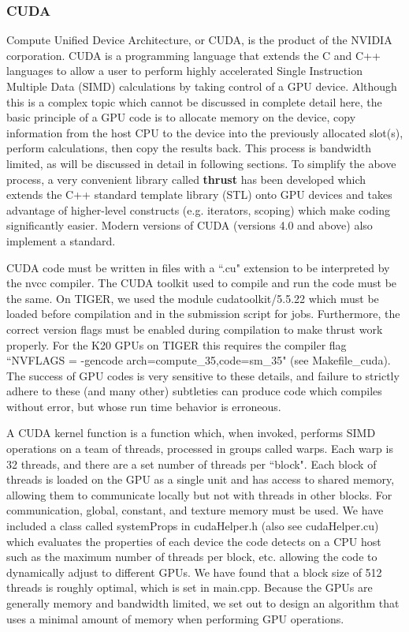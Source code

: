 \documentclass[12pt]{article}
\begin{document}
\subsubsection{CUDA}
Compute Unified Device Architecture, or CUDA, is the product of the NVIDIA corporation.  
%
CUDA is a programming language  that extends the C and C++ languages to allow a user to perform highly accelerated Single Instruction Multiple Data (SIMD) calculations by taking control of a GPU device.  Although this is a complex topic which cannot be discussed in complete detail here, the basic principle of a
GPU code is to allocate memory on the device, copy information from the host CPU to the device into the previously allocated slot(s), perform calculations, then copy the results back. This process is bandwidth limited, as will be discussed in detail in following sections.  To simplify the above process, a very convenient library called \textbf{thrust} has been developed which extends the C++ standard template library (STL) onto GPU devices and takes advantage of higher-level constructs (e.g. iterators, scoping) which make coding significantly easier.  Modern versions of CUDA (versions 4.0 and above) also implement a standard.

CUDA code must be written in files with a ``.cu" extension to be interpreted by the nvcc compiler.  The CUDA toolkit used to compile and run the code must be the same.  On TIGER, we used the module cudatoolkit/5.5.22 which must be loaded before compilation and in the submission script for jobs.  Furthermore, the correct version flags must be enabled during compilation to make thrust work properly.  For the K20 GPUs on TIGER this requires the compiler flag ``NVFLAGS = -gencode arch=compute\_35,code=sm\_35" (see Makefile\_cuda).  The success of GPU codes is very sensitive to these details, and failure to strictly adhere to these (and many other) subtleties can produce code which compiles without error, but whose run time behavior is erroneous.

A CUDA kernel function is a function which, when invoked, performs SIMD operations on a team of threads, processed in groups called warps.  Each warp is 32 threads, and there are a set number of threads per ``block".  Each block of threads is loaded on the GPU as a single unit and has access to shared memory, allowing them to communicate locally but not with threads in other blocks.  For communication, global, constant, and texture memory must be used.  We have included a class called systemProps in cudaHelper.h (also see cudaHelper.cu) which evaluates the properties of each device the code detects on a CPU host such as the maximum number of threads per block, etc. allowing the code to dynamically adjust to different GPUs.  We have found that a block size of 512 threads is roughly optimal, which is set in main.cpp.  Because the GPUs are generally memory and bandwidth limited, we set out to design an algorithm that uses a minimal amount of memory when performing GPU operations.
\end{document}
